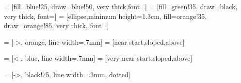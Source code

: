 \documentclass[9pt,            %
               a4paper,         %
               landscape,
               halfparskip,
               oneside,         %
               DIV94,           %
              ]{scrartcl} %
\begin{document}


 = [fill=blue!25, draw=blue!50, very thick,font=\selectfont]
 = [fill=green!35, draw=black, very thick, font=\selectfont]
 = [ellipse,minimum height=1.3cm, fill=orange!35, draw=orange!85, very thick, font=\selectfont\Large]

 = [->, orange, line width=.7mm]
 = [near start,sloped,above]

 = [<-, blue, line width=.7mm]
 = [very near start,sloped,above]

 = [->, black!75, line width=.3mm, dotted]
\end{document}
